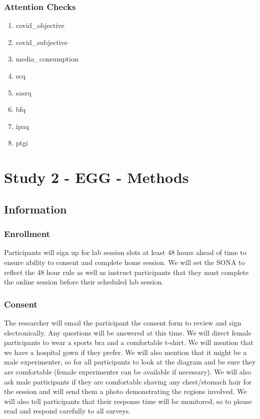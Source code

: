 \documentclass[]{book}
\providecommand{\tightlist}{%
  \setlength{\itemsep}{0pt}\setlength{\parskip}{0pt}}
\begin{document}
\hypertarget{attention-checks}{%
\subsection{Attention Checks}\label{attention-checks}}

\begin{enumerate}
\def\labelenumi{\arabic{enumi}.}
\tightlist
\item
  covid\_objective
\item
  covid\_subjective
\item
  media\_consumption
\item
  scq
\item
  sasrq
\item
  bfq
\item
  ipaq
\item
  ptgi
\end{enumerate}

\hypertarget{study-2---egg---methods}{%
\chapter{Study 2 - EGG - Methods}\label{study-2---egg---methods}}

\hypertarget{information-1}{%
\section{Information}\label{information-1}}

\hypertarget{enrollment}{%
\subsection{Enrollment}\label{enrollment}}

Participants will sign up for lab session slots at least 48 hours ahead of time to ensure ability to consent and complete home session. We will set the SONA to reflect the 48 hour rule as well as instruct participants that they must complete the online session before their scheduled lab session.

\hypertarget{consent}{%
\subsection{Consent}\label{consent}}

The researcher will email the participant the consent form to review and sign electronically. Any questions will be answered at this time. We will direct female participants to wear a sports bra and a comfortable t-shirt. We will mention that we have a hospital gown if they prefer. We will also mention that it might be a male experimenter, so for all participants to look at the diagram and be sure they are comfortable (female experimenter can be available if necessary). We will also ask male participants if they are comfortable shaving any chest/stomach hair for the session and will send them a photo demonstrating the regions involved. We will also tell participants that their response time will be monitored, so to please read and respond carefully to all surveys.
\end{document}
